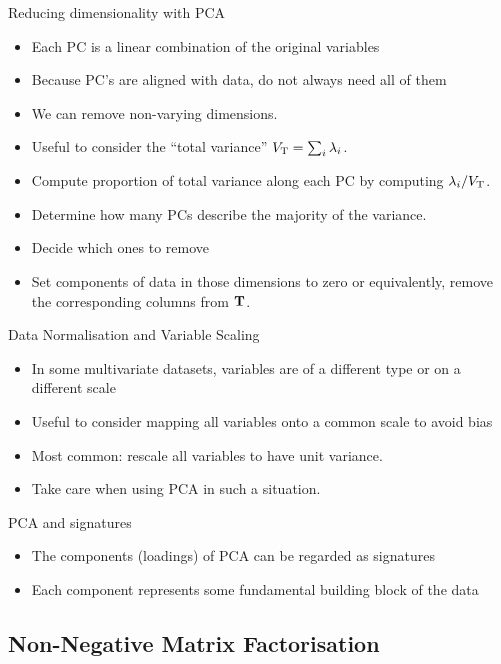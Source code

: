 \documentclass[aspectratio=169]{beamer}
\begin{document}
\begin{frame}{Reducing dimensionality with PCA}
  \begin{itemize}
    \item Each PC is a linear combination of the original variables
    \item Because PC's are aligned with data, do not always need all of them
    \item We can remove non-varying dimensions.
    \item Useful to consider the ``total variance'' $V_{\mathrm{T}} = \sum_i \lambda_i$.
    \item Compute proportion of total variance along each PC by computing $\lambda_i/V_{\mathrm{T}}$. 
    \item Determine how many PCs describe the majority of the variance. 
    \item Decide which ones to remove
    \item Set components of data in those dimensions to zero or equivalently, remove the corresponding columns from $\mathbf{T}$.
  \end{itemize}
\end{frame}

\begin{frame}{Data Normalisation and Variable Scaling}
  \begin{itemize}
    \item In some multivariate datasets, variables are of a different type or on a different scale
    \item Useful to consider mapping all variables onto a common scale to avoid bias
    \item Most common: rescale all variables to have unit variance.
    \item Take care when using PCA in such a situation.
  \end{itemize}
\end{frame}

\begin{frame}{PCA and signatures}
  \begin{itemize}
    \item The components (loadings) of PCA can be regarded as signatures
    \item Each component represents some fundamental building block of the data
  \end{itemize}
\end{frame}



\subsection{Non-Negative Matrix Factorisation}
\end{document}

